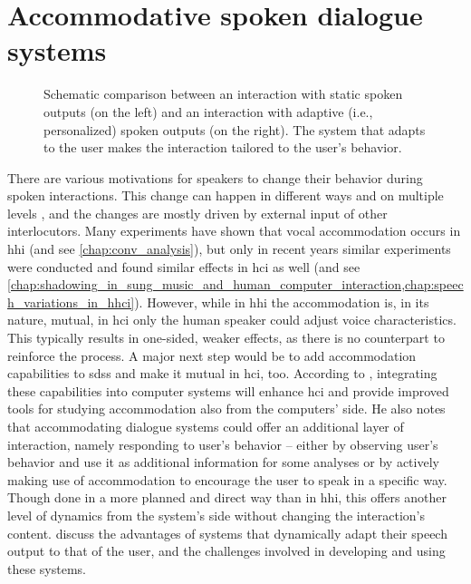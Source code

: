 \section{Accommodative spoken dialogue systems}
\label{sec:adaptive_spoken_dialogue_systems}

\begin{figure}[t]
	\centering
	\hfill %
	\caption[Static vs.\ adaptive speech output]
		{Schematic comparison between an interaction with static spoken outputs (on the left) and an interaction with adaptive (i.e., personalized) spoken outputs (on the right).
		The system that adapts to the user makes the interaction tailored to the user's behavior.}
	\label{fig:static_vs_adaptive_speech_output}
\end{figure}

There are various motivations for speakers to change their behavior during spoken interactions.
This change can happen in different ways and on multiple levels \citep[][and see \cref{chap:phonetic_convergence} for more details]{Gallois2015CAT, Shepard2001CAT}, and the changes are mostly driven by external input of other interlocutors.
Many experiments have shown that vocal accommodation occurs in \ac{hhi} (and see \cref{chap:conv_analysis}), but only in recent years similar experiments were conducted and found similar effects in \ac{hci} as well (and see \cref{chap:shadowing_in_sung_music_and_human_computer_interaction,chap:speech_variations_in_hhci}).
However, while in \ac{hhi} the accommodation is, in its nature, mutual, in \ac{hci} only the human speaker could adjust voice characteristics.
This typically results in one-sided, weaker effects, as there is no counterpart to reinforce the process.
A major next step would be to add accommodation capabilities to \acp{sds} and make it mutual in \ac{hci}, too.
According to \citet{Weise2017towards}, integrating these capabilities into computer systems will enhance \ac{hci} and provide improved tools for studying accommodation also from the computers' side.
He also notes that accommodating dialogue systems could offer an additional layer of interaction, namely responding to user's behavior -- either by observing user's behavior and use it as additional information for some analyses or by actively making use of accommodation to encourage the user to speak in a specific way.
Though done in a more planned and direct way than in \ac{hhi}, this offers another level of dynamics from the system's side without changing the interaction's content.
\citet{Oviatt2004adaptive} discuss the advantages of systems that dynamically adapt their speech output to that of the user, and the challenges involved in developing and using these systems.

